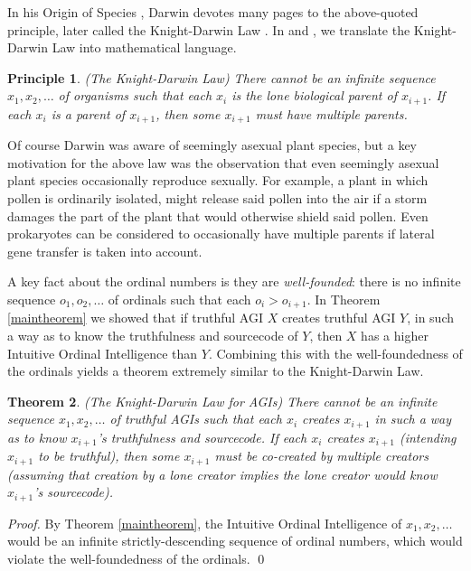 \documentclass[runningheads]{llncs}
\newtheorem{mytheorem}{Theorem}
\newtheorem{myprinciple}[mytheorem]{Principle}
\begin{document}
In his Origin of Species \cite{originofspecies}, Darwin devotes many
pages to the above-quoted principle, later called the
Knight-Darwin Law \cite{darwin1898knight}. In \cite{alexander2013} and
\cite{alexander2015alternative}, we translate
the Knight-Darwin Law into mathematical language.

\begin{myprinciple}
(The Knight-Darwin Law)
There cannot be an infinite sequence
$x_1,x_2,\ldots$ of organisms such that each $x_i$
is the lone biological parent of $x_{i+1}$.
If each $x_i$ is a parent of $x_{i+1}$, then some $x_{i+1}$
must have multiple parents.
\end{myprinciple}

Of course Darwin was aware of seemingly asexual plant species, but
a key motivation for the above law was the observation that even
seemingly asexual plant species occasionally reproduce sexually.
For example, a plant in which pollen is ordinarily isolated, might
release said pollen into the air if a storm damages the part of the
plant that would otherwise shield said pollen. Even prokaryotes can
be considered to occasionally have multiple parents if lateral gene
transfer is taken into account.

A key fact about the ordinal numbers is they are
\emph{well-founded}: there is
no infinite sequence $o_1,o_2,\ldots$ of ordinals such that each
$o_i>o_{i+1}$. In Theorem \ref{maintheorem} we showed that if truthful
AGI $X$ creates truthful AGI $Y$, in such a way as to know the truthfulness
and sourcecode of $Y$, then $X$ has a higher Intuitive Ordinal Intelligence
than $Y$. Combining this with the well-foundedness of the ordinals yields
a theorem extremely similar to the Knight-Darwin Law.

\begin{mytheorem}
\label{maintheorem2}
(The Knight-Darwin Law for AGIs)
There cannot be an infinite sequence
$x_1,x_2,\ldots$ of truthful AGIs such that each $x_i$
creates $x_{i+1}$ in such a way as to know $x_{i+1}$'s truthfulness and sourcecode.
If each $x_i$ creates $x_{i+1}$ (intending $x_{i+1}$ to be truthful), then
some $x_{i+1}$ must be co-created by multiple creators (assuming that creation by
a lone creator implies the lone creator would know $x_{i+1}$'s sourcecode).
\end{mytheorem}

\begin{proof}
By Theorem \ref{maintheorem}, the Intuitive Ordinal Intelligence of $x_1,x_2,\ldots$
would be an infinite strictly-descending sequence of ordinal numbers, which would
violate the well-foundedness of the ordinals.
\qed
\end{proof}
\end{document}
